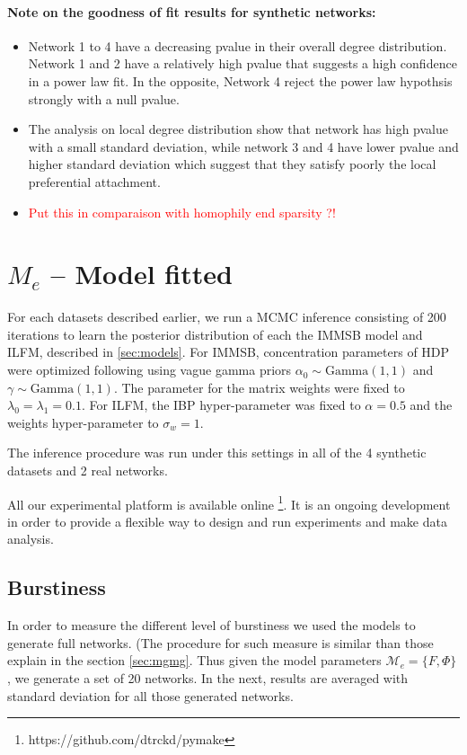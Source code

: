 \documentclass[a4paper, 12pt]{article}
\begin{document}
\paragraph{Note on the goodness of fit results for synthetic networks:}
\begin{itemize}
    \item Network 1 to 4 have a decreasing pvalue in their overall degree distribution. Network 1 and 2 have a relatively high pvalue that suggests a high confidence in a power law fit. In the opposite, Network 4 reject the power law hypothsis strongly with a null pvalue.
    \item The analysis on local degree distribution show that network has high pvalue with a small standard deviation, while network 3 and 4 have lower pvalue and higher standard deviation which suggest that they satisfy poorly the local preferential attachment.
    \item \textcolor{red}{Put this in comparaison with homophily end sparsity ?!}
\end{itemize}


\section{$M_e$ -- Model fitted}

For each datasets described earlier, we run a MCMC inference consisting of 200 iterations to learn the posterior distribution of each the IMMSB model and ILFM, described in \ref{sec:models}. For IMMSB, concentration parameters of HDP were optimized following \cite{HDP} using vague gamma priors $\alpha_0 \sim \text{Gamma}(1,1)$ and $\gamma \sim \text{Gamma}(1,1)$. The parameter for the matrix weights were fixed to $\lambda_0=\lambda_1=0.1$. For ILFM, the IBP hyper-parameter was fixed to $\alpha=0.5$ and the weights hyper-parameter to $\sigma_w = 1$. 

The inference procedure was run under this settings in all of the 4 synthetic datasets and 2 real networks.

All our experimental platform is available online \footnote{https://github.com/dtrckd/pymake}. It is an ongoing development in order to provide a flexible way to design and run experiments and make data analysis.

\subsection{Burstiness}

In order to measure the different level of burstiness we used the models to generate full networks. (The procedure for such measure is similar than those explain in the section \ref{sec:mgmg}. Thus given the model parameters $\mathcal{M}_e = \{F ,\Phi\}$, we generate a set of 20 networks. In the next, results are averaged  with standard deviation for all those generated networks.
\end{document}
